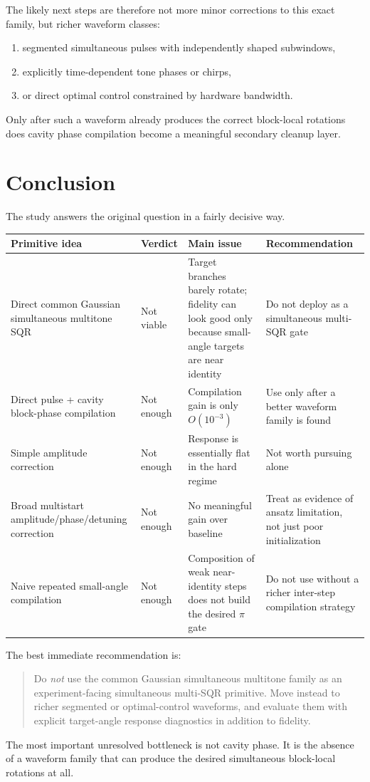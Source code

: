 \documentclass[11pt]{article}
\begin{document}
The likely next steps are therefore not more minor corrections to this exact
family, but richer waveform classes:
\begin{enumerate}
    \item segmented simultaneous pulses with independently shaped subwindows,
    \item explicitly time-dependent tone phases or chirps,
    \item or direct optimal control constrained by hardware bandwidth.
\end{enumerate}
Only after such a waveform already produces the correct block-local rotations
does cavity phase compilation become a meaningful secondary cleanup layer.

\section{Conclusion}

The study answers the original question in a fairly decisive way.

\begin{center}
\begin{tabular}{>{\raggedright\arraybackslash}p{4.0cm}p{2.2cm}p{2.4cm}p{5.0cm}}
\toprule
Primitive idea & Verdict & Main issue & Recommendation \\
\midrule
Direct common Gaussian simultaneous multitone SQR & Not viable & Target branches barely rotate; fidelity can look good only because small-angle targets are near identity & Do not deploy as a simultaneous multi-SQR gate \\
Direct pulse + cavity block-phase compilation & Not enough & Compilation gain is only \(O(10^{-3})\) & Use only after a better waveform family is found \\
Simple amplitude correction & Not enough & Response is essentially flat in the hard regime & Not worth pursuing alone \\
Broad multistart amplitude/phase/detuning correction & Not enough & No meaningful gain over baseline & Treat as evidence of ansatz limitation, not just poor initialization \\
Naive repeated small-angle compilation & Not enough & Composition of weak near-identity steps does not build the desired \(\pi\) gate & Do not use without a richer inter-step compilation strategy \\
\bottomrule
\end{tabular}
\end{center}

The best immediate recommendation is:
\begin{quote}
Do \emph{not} use the common Gaussian simultaneous multitone family as an
experiment-facing simultaneous multi-SQR primitive. Move instead to richer
segmented or optimal-control waveforms, and evaluate them with explicit
target-angle response diagnostics in addition to fidelity.
\end{quote}

The most important unresolved bottleneck is not cavity phase. It is the absence
of a waveform family that can produce the desired simultaneous block-local
rotations at all.
\end{document}
